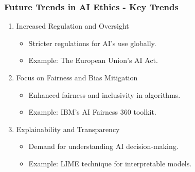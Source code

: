 \documentclass[aspectratio=169]{beamer}
\begin{document}
\begin{frame}[fragile]
    \frametitle{Future Trends in AI Ethics - Key Trends}
    \begin{enumerate}
        \item Increased Regulation and Oversight
            \begin{itemize}
                \item Stricter regulations for AI's use globally.
                \item Example: The European Union's AI Act.
            \end{itemize}
        \item Focus on Fairness and Bias Mitigation
            \begin{itemize}
                \item Enhanced fairness and inclusivity in algorithms.
                \item Example: IBM’s AI Fairness 360 toolkit.
            \end{itemize}
        \item Explainability and Transparency
            \begin{itemize}
                \item Demand for understanding AI decision-making.
                \item Example: LIME technique for interpretable models.
            \end{itemize}
    \end{enumerate}
\end{frame}
\end{document}
